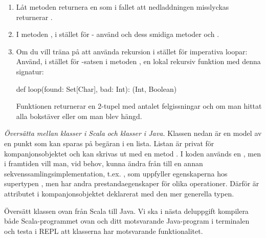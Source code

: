 \begin{enumerate}
\item Låt metoden  returnera en  som i fallet att nedladdningen misslyckas returnerar .

\item I metoden , i stället för - använd  och dess smidiga metoder  och .

\item Om du vill träna på att använda rekursion i stället för imperativa loopar: Använd, i stället för -satsen i metoden , en lokal rekursiv funktion med denna signatur:
\begin{Code}
  def loop(found: Set[Char], bad: Int): (Int, Boolean)
\end{Code}
Funktionen  returnerar en 2-tupel med antalet felgissningar och  om man hittat alla bokstäver eller  om man blev hängd.

\end{enumerate}





\Task \emph{Översätta mellan klasser i Scala och klasser i Java.}
Klassen  nedan är en model av en punkt som kan sparas på begäran i en lista. Listan är privat för kompanjonsobjektet och kan skrivas ut med en metod . I koden används en , men i framtiden vill man, vid behov, kunna ändra från  till en annan sekvenssamlingsimplementation, t.ex. , som uppfyller egenskaperna hos supertypen , men har andra prestandaegenskaper för olika operationer. Därför är attributet  i kompanjonsobjektet deklarerat med den mer generella typen.


\Subtask Översätt klassen  ovan från Scala till Java. Vi ska i nästa deluppgift kompilera både Scala-programmet ovan och ditt motsvarande Java-program i terminalen och testa i REPL att klasserna har motsvarande funktionalitet.

